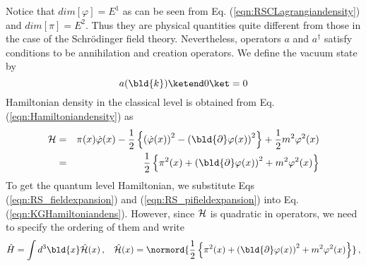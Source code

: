 %
%

\noindent
Notice that $dim [\varphi] = E^1$ as can be seen from Eq. (\ref{eqn:RSCLagrangiandensity})
and $dim [\pi] = E^2$. Thus they are physical quantities  quite different from
those in the case of the Schr\"odinger field theory.
Nevertheless, operators $a$ and $a^\dagger$ satisfy conditions to be 
annihilation and creation operators. We define the vacuum state by
\begin{equation}
a(\bld{k}) \ketend 0 \ket = 0
\end{equation}
Hamiltonian density in the classical level is obtained from Eq. (\ref{eqn:Hamiltoniandensity}) as
\begin{eqnarray}
{\cal H} &=& \pi(x) \dot{\varphi}(x) - \frac{1}{2} \left\{
\left( \dot{\varphi}(x) \right)^2 - 
\left( \bld{\partial} \varphi(x) \right)^2 \right\}
+ \frac{1}{2} m^2 \varphi^2(x)
\nonumber\\
&=&
\frac{1}{2} \left\{
\pi^2 (x) + \left( \bld{\partial} \varphi(x) \right)^2 + m^2 \varphi^2(x)
\right\}
\label{eqn:KGHamiltoniandens}
\end{eqnarray}
To get the quantum level Hamiltonian,
we substitute Eqs (\ref{eqn:RS_fieldexpansion}) and (\ref{eqn:RS_pifieldexpansion})
into Eq. (\ref{eqn:KGHamiltoniandens}). However, since ${\cal H}$ is quadratic
in operators, we need to specify the ordering of them and write
\begin{equation}
\hat{H} = \int d^3 \bld{x} \hat{{\cal H}}(x)\,,
\hspace{3mm}
\hat{{\cal H}}(x) = 
\normord{ \frac{1}{2} \left\{
\pi^2 (x) + \left( \bld{\partial} \varphi(x) \right)^2 + m^2 \varphi^2(x)
\right\}
}\,,
\label{eqn:KG_Hamiltonian}
\end{equation}
